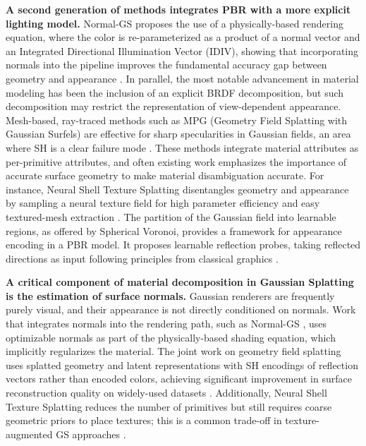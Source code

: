 \documentclass[11pt,a4paper]{article}
\begin{document}
\textbf{A second generation of methods integrates PBR with a more explicit lighting model.} Normal-GS proposes the use of a physically-based rendering equation, where the color is re-parameterized as a product of a normal vector and an Integrated Directional Illumination Vector (IDIV), showing that incorporating normals into the pipeline improves the fundamental accuracy gap between geometry and appearance \cite{arxiv:2410.20593v1}. In parallel, the most notable advancement in material modeling has been the inclusion of an explicit BRDF decomposition, but such decomposition may restrict the representation of view-dependent appearance. Mesh-based, ray-traced methods such as MPG (Geometry Field Splatting with Gaussian Surfels) are effective for sharp specularities in Gaussian fields, an area where SH is a clear failure mode \cite{arxiv:2411.17067v2}. These methods integrate material attributes as per-primitive attributes, and often existing work emphasizes the importance of accurate surface geometry to make material disambiguation accurate. For instance, Neural Shell Texture Splatting disentangles geometry and appearance by sampling a neural texture field for high parameter efficiency and easy textured-mesh extraction \cite{arxiv:2507.20200v1}. The partition of the Gaussian field into learnable regions, as offered by Spherical Voronoi, provides a framework for appearance encoding in a PBR model. It proposes learnable reflection probes, taking reflected directions as input following principles from classical graphics \cite{arxiv:2512.14180v2}.

\textbf{A critical component of material decomposition in Gaussian Splatting is the estimation of surface normals.} Gaussian renderers are frequently purely visual, and their appearance is not directly conditioned on normals. Work that integrates normals into the rendering path, such as Normal-GS \cite{arxiv:2410.20593v1}, uses optimizable normals as part of the physically-based shading equation, which implicitly regularizes the material. The joint work on geometry field splatting uses splatted geometry and latent representations with SH encodings of reflection vectors rather than encoded colors, achieving significant improvement in surface reconstruction quality on widely-used datasets \cite{arxiv:2411.17067v2}. Additionally, Neural Shell Texture Splatting reduces the number of primitives but still requires coarse geometric priors to place textures; this is a common trade-off in texture-augmented GS approaches \cite{arxiv:2507.20200v1}.
\end{document}
